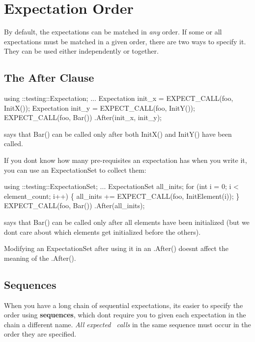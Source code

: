 \section*{Expectation Order}

By default, the expectations can be matched in {\itshape any} order. If some or all expectations must be matched in a given order, there are two ways to specify it. They can be used either independently or together.

\subsection*{The After Clause}


\begin{DoxyCode}
using ::testing::Expectation;
...
Expectation init\_x = EXPECT\_CALL(foo, InitX());
Expectation init\_y = EXPECT\_CALL(foo, InitY());
EXPECT\_CALL(foo, Bar())
    .After(init\_x, init\_y);
\end{DoxyCode}
 says that {\ttfamily Bar()} can be called only after both {\ttfamily Init\+X()} and {\ttfamily Init\+Y()} have been called.

If you don\textquotesingle{}t know how many pre-\/requisites an expectation has when you write it, you can use an {\ttfamily Expectation\+Set} to collect them\+:


\begin{DoxyCode}
using ::testing::ExpectationSet;
...
ExpectationSet all\_inits;
\textcolor{keywordflow}{for} (\textcolor{keywordtype}{int} i = 0; i < element\_count; i++) \{
  all\_inits += EXPECT\_CALL(foo, InitElement(i));
\}
EXPECT\_CALL(foo, Bar())
    .After(all\_inits);
\end{DoxyCode}
 says that {\ttfamily Bar()} can be called only after all elements have been initialized (but we don\textquotesingle{}t care about which elements get initialized before the others).

Modifying an {\ttfamily Expectation\+Set} after using it in an {\ttfamily .After()} doesn\textquotesingle{}t affect the meaning of the {\ttfamily .After()}.

\subsection*{Sequences}

When you have a long chain of sequential expectations, it\textquotesingle{}s easier to specify the order using {\bfseries sequences}, which don\textquotesingle{}t require you to given each expectation in the chain a different name. {\itshape All expected~\newline
 calls} in the same sequence must occur in the order they are specified.


